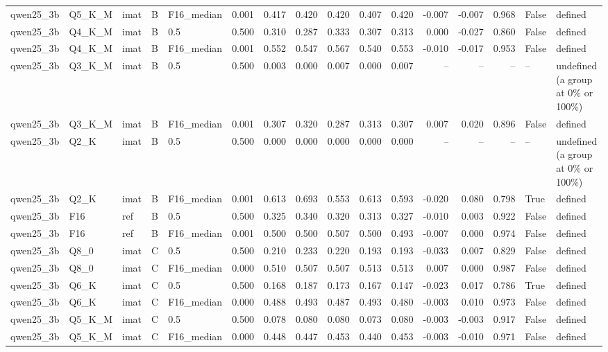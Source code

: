 \begin{tabular}{lllllrrrrrrrrrll}
qwen25\_3b & Q5\_K\_M & imat & B & F16\_median & 0.001 & 0.417 & 0.420 & 0.420 & 0.407 & 0.420 & -0.007 & -0.007 & 0.968 & False & defined \\
qwen25\_3b & Q4\_K\_M & imat & B & 0.5 & 0.500 & 0.310 & 0.287 & 0.333 & 0.307 & 0.313 & 0.000 & -0.027 & 0.860 & False & defined \\
qwen25\_3b & Q4\_K\_M & imat & B & F16\_median & 0.001 & 0.552 & 0.547 & 0.567 & 0.540 & 0.553 & -0.010 & -0.017 & 0.953 & False & defined \\
qwen25\_3b & Q3\_K\_M & imat & B & 0.5 & 0.500 & 0.003 & 0.000 & 0.007 & 0.000 & 0.007 & -- & -- & -- & -- & undefined (a group at 0\% or 100\%) \\
qwen25\_3b & Q3\_K\_M & imat & B & F16\_median & 0.001 & 0.307 & 0.320 & 0.287 & 0.313 & 0.307 & 0.007 & 0.020 & 0.896 & False & defined \\
qwen25\_3b & Q2\_K & imat & B & 0.5 & 0.500 & 0.000 & 0.000 & 0.000 & 0.000 & 0.000 & -- & -- & -- & -- & undefined (a group at 0\% or 100\%) \\
qwen25\_3b & Q2\_K & imat & B & F16\_median & 0.001 & 0.613 & 0.693 & 0.553 & 0.613 & 0.593 & -0.020 & 0.080 & 0.798 & True & defined \\
qwen25\_3b & F16 & ref & B & 0.5 & 0.500 & 0.325 & 0.340 & 0.320 & 0.313 & 0.327 & -0.010 & 0.003 & 0.922 & False & defined \\
qwen25\_3b & F16 & ref & B & F16\_median & 0.001 & 0.500 & 0.500 & 0.507 & 0.500 & 0.493 & -0.007 & 0.000 & 0.974 & False & defined \\
qwen25\_3b & Q8\_0 & imat & C & 0.5 & 0.500 & 0.210 & 0.233 & 0.220 & 0.193 & 0.193 & -0.033 & 0.007 & 0.829 & False & defined \\
qwen25\_3b & Q8\_0 & imat & C & F16\_median & 0.000 & 0.510 & 0.507 & 0.507 & 0.513 & 0.513 & 0.007 & 0.000 & 0.987 & False & defined \\
qwen25\_3b & Q6\_K & imat & C & 0.5 & 0.500 & 0.168 & 0.187 & 0.173 & 0.167 & 0.147 & -0.023 & 0.017 & 0.786 & True & defined \\
qwen25\_3b & Q6\_K & imat & C & F16\_median & 0.000 & 0.488 & 0.493 & 0.487 & 0.493 & 0.480 & -0.003 & 0.010 & 0.973 & False & defined \\
qwen25\_3b & Q5\_K\_M & imat & C & 0.5 & 0.500 & 0.078 & 0.080 & 0.080 & 0.073 & 0.080 & -0.003 & -0.003 & 0.917 & False & defined \\
qwen25\_3b & Q5\_K\_M & imat & C & F16\_median & 0.000 & 0.448 & 0.447 & 0.453 & 0.440 & 0.453 & -0.003 & -0.010 & 0.971 & False & defined \\

\end{tabular}
